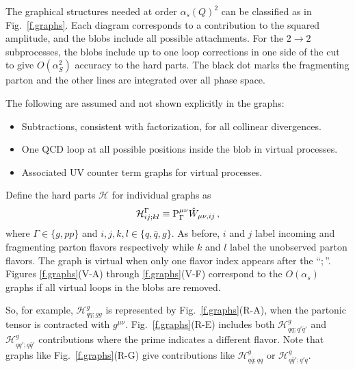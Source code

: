\documentclass[prd,preprintnumbers,nofootinbib,superscriptaddress,onecolumn,preprint]{revtex4-1}
\newcommand\3[1]{\boldsymbol{#1}}
\newcommand{\parz}[1]{\ensuremath{\left(#1\right)}}
\newcommand{\order}[1]{\ensuremath{O\parz{#1}}}
\newcommand{\contractor}[1]{\ensuremath{{\rm P}}_{#1}}
\newcommand{\hard}{\ensuremath{\mathcal{H}}}
\newcommand{\fref}[1]{Fig.~\ref{f.#1}}
\begin{document}
The graphical structures needed at order 
$\alpha_s(Q)^2$ can be
classified as in \fref{graphs}.  Each diagram corresponds to a
contribution to the squared amplitude, and the blobs include all
possible attachments. 
For the $2\to2$ subprocesses, the blobs include
up to one loop corrections in one side of the cut to give
$O(\alpha_S^2)$ accuracy to the hard parts.
The black dot marks the fragmenting parton and
the other lines are integrated over all phase space.

The following are assumed and not shown explicitly in the graphs:
%
\begin{itemize}
\item Subtractions, consistent with factorization, for all collinear divergences.
\item One QCD loop at all possible positions inside the blob in virtual processes.
\item Associated UV counter term graphs for virtual processes.
\end{itemize}
%
Define the hard parts $\hard$ for individual graphs as 
%
\begin{equation}
\hard^{\Gamma}_{ij;kl} \equiv
\contractor{\Gamma}^{\mu \nu} \hat{W}_{\mu \nu, i j} \, ,
\end{equation}
%
where $\Gamma \in \{g, pp\}$ and $i, j, k, l \in \{q, \bar{q}, g\}$.
As before, $i$ and $j$ label incoming and fragmenting parton flavors
respectively while $k$ and $l$ label the unobserved parton flavors.
The graph is virtual when only one flavor index appears after the
``$;$''. Figures \ref{f.graphs}(V-A) through \ref{f.graphs}(V-F)
correspond to the $\order{\alpha_s}$ graphs if all virtual loops in
the blobs are removed.

So, for example, $\hard^g_{qq;gg}$ is represented by
\fref{graphs}(R-A), when the partonic tensor is contracted with
$g^{\mu \nu}$. \fref{graphs}(R-E)  includes both
$\hard^g_{qq;q'\bar{q}'}$ and $\hard^g_{qq';q\bar{q}'}$ contributions
where the prime indicates a different flavor.  Note that graphs like
\fref{graphs}(R-G) give contributions like $\hard^g_{q\bar{q};q q}$ or
$\hard^g_{q\bar{q}';q' q}$. 
\end{document}
